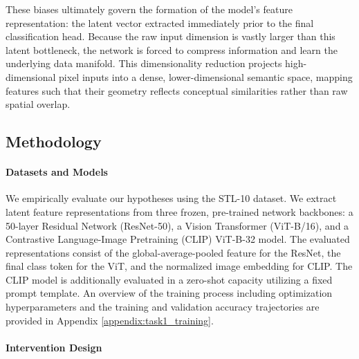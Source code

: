\documentclass{article}
\begin{document}
These biases ultimately govern the formation of the model's feature representation: the latent vector extracted immediately prior to the final classification head. Because the raw input dimension is vastly larger than this latent bottleneck, the network is forced to compress information and learn the underlying data manifold. This dimensionality reduction projects high-dimensional pixel inputs into a dense, lower-dimensional semantic space, mapping features such that their geometry reflects conceptual similarities rather than raw spatial overlap.

\subsection{Methodology}

\paragraph{Datasets and Models}

We empirically evaluate our hypotheses using the STL-10 dataset. We extract latent feature representations from three frozen, pre-trained network backbones: a 50-layer Residual Network (ResNet-50), a Vision Transformer (ViT-B/16), and a Contrastive Language-Image Pretraining (CLIP) ViT-B-32 model. The evaluated representations consist of the global-average-pooled feature for the ResNet, the final class token for the ViT, and the normalized image embedding for CLIP. The CLIP model is additionally evaluated in a zero-shot capacity utilizing a fixed prompt template. An overview of the training process including optimization hyperparameters and the training and validation accuracy trajectories are provided in Appendix \ref{appendix:task1_training}.

\paragraph{Intervention Design}
\end{document}
